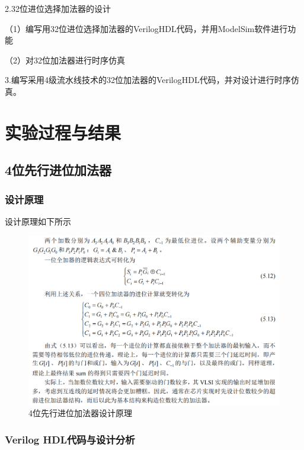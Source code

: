 \documentclass[12pt,hyperref,a4paper,UTF8]{ctexart}
\begin{document}
2.32位进位选择加法器的设计

（1）编写用32位进位选择加法器的VerilogHDL代码，并用ModelSim软件进行功能

（2）对32位加法器进行时序仿真

3.编写采用4级流水线技术的32位加法器的VerilogHDL代码，并对设计进行时序仿真。

\newpage

\section{实验过程与结果}

\subsection{4位先行进位加法器}


\subsubsection{设计原理}
  设计原理如下所示

    \begin{figure}[H]
        \centering
        \includegraphics[width =1.1\textwidth]{figures/fig/image.png}
        \caption{4位先行进位加法器设计原理}
        \label{fig:enter-label}
    \end{figure}

\subsubsection{Verilog HDL代码与设计分析}
\end{document}
